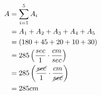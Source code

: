\documentclass{beamer}
\begin{document}
\begin{frame}[plain]
\begin{columns}[t]
	   		 \begin{align*}
   				A &=\sum_{i=1}^{5}A_i \\
					&=A_1 + A_2 + A_3 + A_4 + A_5\\
					&= \left(180 + 45 + 20 + 10 + 30\right) \\
					&= 285\left(\dfrac{sec}{1} \cdot \dfrac{cm}{sec}\right) \\
					&= 285\left(\dfrac{\cancel{sec}}{1} \cdot \dfrac{cm}{\cancel{sec}}\right) \\
					&= 285 cm
			\end{align*} 
		
	    \end{columns}
	    


\end{frame}  

\end{document}
